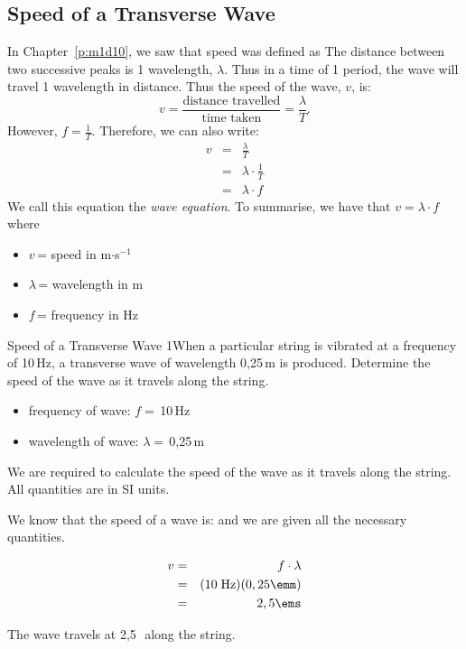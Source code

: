 \subsection{Speed of a Transverse Wave}
In Chapter~\ref{p:m1d10}, we saw that speed was defined as
The distance between two successive peaks is 1 wavelength, $\lambda$. Thus in a time of 1 period, the wave will travel 1 wavelength in distance. Thus the speed of the wave, $v$, is:
\begin{equation*}
v=\frac{\text{distance travelled}}{\text{time taken}}=\frac{\lambda}{T}.
\end{equation*}
However, $f=\frac{1}{T}$. Therefore, we can also write:
\begin{eqnarray*}
v&=&\frac{\lambda}{T}\\
&=&\lambda \cdot \frac{1}{T}\\
&=&\lambda \cdot f
\end{eqnarray*}
We call this equation the \emph{wave equation}. To summarise, we have that $v=\lambda\cdot f$ where
\begin{itemize}
\item $v$\,= speed in m$\cdot$s$^{-1}$
\item $\lambda$\,= wavelength in m
\item $f$\,= frequency in Hz
\end{itemize}
\begin{wex}{Speed of a Transverse Wave 1}{When a particular string is vibrated at a frequency of 10\,Hz, a transverse wave of wavelength 0,25\,m is produced. Determine the speed of the wave as it travels along the string.}
{
\begin{itemize}
\item{frequency of wave: $f=$\,10\,Hz}
\item{wavelength of wave: $\lambda=$\,0,25\,m}
\end{itemize}
We are required to calculate the speed of the wave as it travels along the string. All quantities are in SI units.

We know that the speed of a wave is:
and we are given all the necessary quantities.

\begin{eqnarray*}
v&=&f\cdot \lambda\\
&=&(10\;\mathrm{Hz})(0,25\emm)\\
&=&2,5\ems
\end{eqnarray*}

The wave travels at 2,5\,\ms\ along the string.
}
\end{wex}

